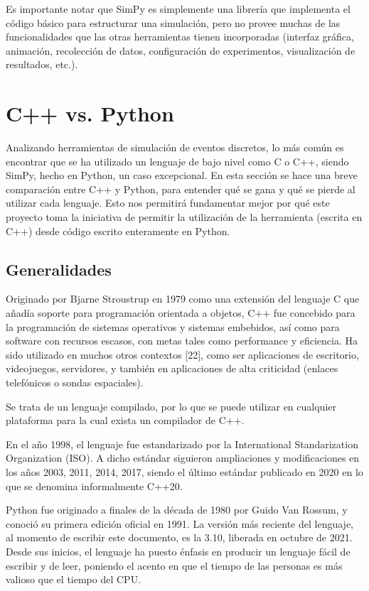 Es importante notar que SimPy es simplemente una librería que implementa el
código básico para estructurar una simulación, pero no provee muchas de las
funcionalidades que las otras herramientas tienen incorporadas (interfaz
gráfica, animación, recolección de datos, configuración de experimentos,
visualización de resultados, etc.).

\section{C++ vs. Python}

Analizando herramientas de simulación de eventos discretos, lo más común es
encontrar que se ha utilizado un lenguaje de bajo nivel como C o C++, siendo
SimPy, hecho en Python, un caso excepcional. En esta sección se hace una breve
comparación entre C++ y Python, para entender qué se gana y qué se pierde al
utilizar cada lenguaje. Esto nos permitirá fundamentar mejor por qué este
proyecto toma la iniciativa de permitir la utilización de la herramienta
\omnetpp{} (escrita en C++) desde código escrito enteramente en Python.

\subsection{Generalidades}

Originado por Bjarne Stroustrup en 1979 como una extensión del lenguaje C que
añadía soporte para programación orientada a objetos, C++ fue concebido para la
programación de sistemas operativos y sistemas embebidos, así como para
software con recursos escasos, con metas tales como performance y eficiencia.
Ha sido utilizado en muchos otros contextos [22], como ser aplicaciones de
escritorio, videojuegos, servidores, y también en aplicaciones de alta
criticidad (enlaces telefónicos o sondas espaciales).

Se trata de un lenguaje compilado, por lo que se puede utilizar en cualquier
plataforma para la cual exista un compilador de C++.

En el año 1998, el lenguaje fue estandarizado por la International
Standarization Organization (ISO). A dicho estándar siguieron ampliaciones y
modificaciones en los años 2003, 2011, 2014, 2017, siendo el último estándar
publicado en 2020 en lo que se denomina informalmente C++20.

Python fue originado a finales de la década de 1980 por Guido Van Rossum, y
conoció su primera edición oficial en 1991. La versión más reciente del
lenguaje, al momento de escribir este documento, es la 3.10, liberada en
octubre de 2021. Desde sus inicios, el lenguaje ha puesto énfasis en producir
un lenguaje fácil de escribir y de leer, poniendo el acento en que el tiempo de
las personas es más valioso que el tiempo del CPU.

